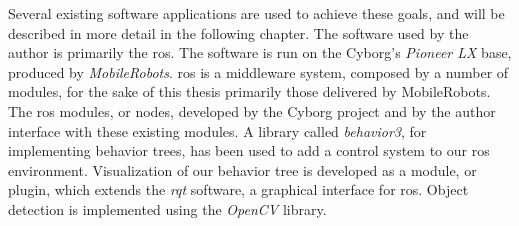\documentclass[\rootfolder/main.tex]{subfiles}
\begin{document}
Several existing software applications are used to achieve these goals, and will be described in more detail in the following chapter.
The software used by the author is primarily the \acrfull{ros}.
The  software is run on the Cyborg's \emph{Pioneer LX} base, produced by \emph{MobileRobots}.
\acrshort{ros} is a middleware system, composed by a number of modules, for the sake of this thesis primarily those delivered by MobileRobots.
The \acrshort{ros} modules, or nodes, developed by the Cyborg project and by the author interface with these existing modules.
A library called \emph{behavior3}, for implementing behavior trees, has been used to add a control system to our \acrshort{ros} environment.
Visualization of our behavior tree is developed as a module, or plugin, which extends the \emph{rqt} software, a graphical interface for \acrshort{ros}.
Object detection is implemented using the \emph{OpenCV} library.
\end{document}
